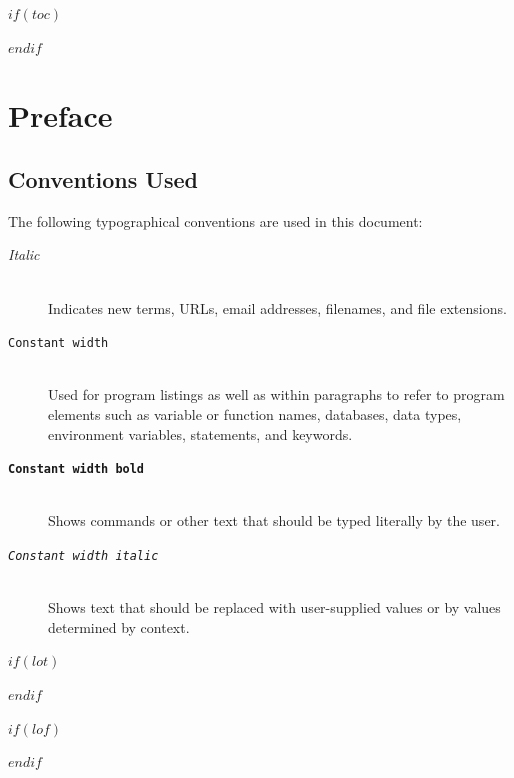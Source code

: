 \documentclass[
    $if(fontsize)$$fontsize$$else$10pt$endif$,
    $if(papersize)$$papersize$$else$letterpaper$endif$,
    titlepage,
    oneside,
    openright,
    $if(draft)$draft$else$final$endif$,
    article]{memoir}
\providecommand{\tightlist}{%
    \setlength{\itemsep}{0pt}\setlength{\parskip}{0pt}
}
\begin{document}
%
%
$if(toc)$
{
    \cleardoublepage
    \begin{KeepFromToc} %
        \tableofcontents
    \end{KeepFromToc}
    \pagebreak
    \cleardoublepage
}
$endif$

\chapter*{Preface}

\hypertarget{conventions}{%
\section{Conventions Used}\label{conventions}}

The following typographical conventions are used in this document:

\begin{description}
\item[\textnormal{\textit{Italic}}]\hfill \\
Indicates new terms, URLs, email addresses, filenames, and file
extensions.

\item[\textnormal{\texttt{Constant width}}]\hfill \\
Used for program listings as well as within paragraphs to refer to
program elements such as variable or function names, databases, data
types, environment variables, statements, and keywords.

\item[\textbf{\texttt{Constant width bold}}]\hfill \\
Shows commands or other text that should be typed literally by the user.

\item[\textnormal{\texttt{\textit{Constant width italic}}}]\hfill \\
Shows text that should be replaced with user-supplied values or by
values determined by context.
\end{description}

\pagebreak
\cleardoublepage



$if(lot)$
    \listoftables
$endif$

$if(lof)$
    \listoffigures
$endif$

\end{document}
